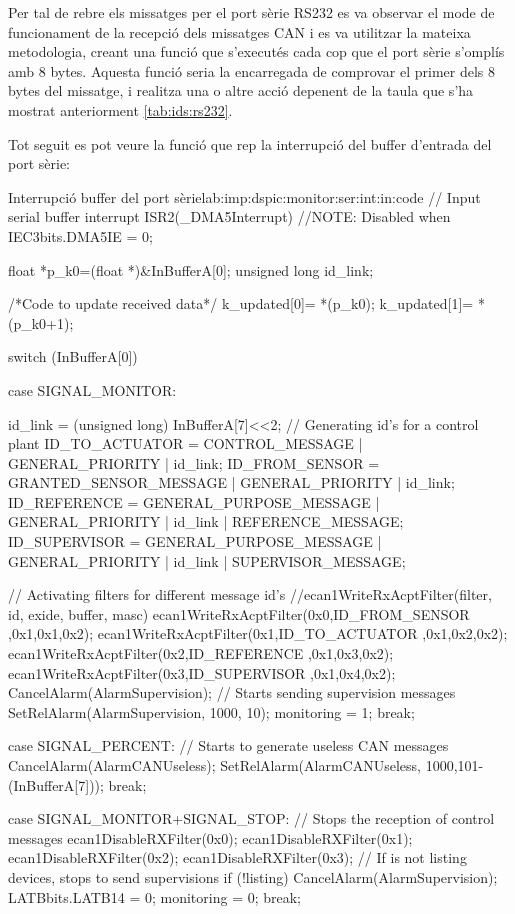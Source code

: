 Per tal de rebre els missatges per el port sèrie RS232 es va observar el mode de funcionament de la recepció dels missatges CAN i es va utilitzar la mateixa metodologia, creant una funció que s'executés cada cop que el port sèrie s'omplís amb 8 bytes. Aquesta funció seria la encarregada de comprovar el primer dels 8 bytes del missatge, i realitza una o altre acció depenent de la taula que s'ha mostrat anteriorment \ref{tab:ids:rs232}.

Tot seguit es pot veure la funció que rep la interrupció del buffer d'entrada del port sèrie:

\begin{code_c}{Interrupció buffer del port sèrie}{lab:imp:dspic:monitor:ser:int:in:code}
// Input serial buffer interrupt
ISR2(_DMA5Interrupt) //NOTE: Disabled when IEC3bits.DMA5IE = 0;
{
	float *p_k0=(float *)&InBufferA[0];
	unsigned long id_link;

	/*Code to update received data*/
	k_updated[0]= *(p_k0);
	k_updated[1]= *(p_k0+1);

	switch (InBufferA[0])
	{
	case SIGNAL_MONITOR:

		id_link = (unsigned long) InBufferA[7]<<2;
		// Generating id's for a control plant
		ID_TO_ACTUATOR 		= CONTROL_MESSAGE 			| GENERAL_PRIORITY | id_link;
		ID_FROM_SENSOR		= GRANTED_SENSOR_MESSAGE 	| GENERAL_PRIORITY | id_link;
		ID_REFERENCE		= GENERAL_PURPOSE_MESSAGE 	| GENERAL_PRIORITY | id_link | REFERENCE_MESSAGE;
		ID_SUPERVISOR		= GENERAL_PURPOSE_MESSAGE 	| GENERAL_PRIORITY | id_link | SUPERVISOR_MESSAGE;

		// Activating filters for different message id's
		//ecan1WriteRxAcptFilter(filter, id, exide, buffer, masc)
		ecan1WriteRxAcptFilter(0x0,ID_FROM_SENSOR	,0x1,0x1,0x2);
		ecan1WriteRxAcptFilter(0x1,ID_TO_ACTUATOR	,0x1,0x2,0x2);
		ecan1WriteRxAcptFilter(0x2,ID_REFERENCE		,0x1,0x3,0x2);
		ecan1WriteRxAcptFilter(0x3,ID_SUPERVISOR	,0x1,0x4,0x2);
		CancelAlarm(AlarmSupervision);
		// Starts sending supervision messages
		SetRelAlarm(AlarmSupervision, 1000, 10);
		monitoring = 1;
		break;

	case SIGNAL_PERCENT:
		// Starts to generate useless CAN messages
		CancelAlarm(AlarmCANUseless);
		SetRelAlarm(AlarmCANUseless, 1000,101-(InBufferA[7]));
		break;

	case SIGNAL_MONITOR+SIGNAL_STOP:
		// Stops the reception of control messages
		ecan1DisableRXFilter(0x0);
		ecan1DisableRXFilter(0x1);
		ecan1DisableRXFilter(0x2);
		ecan1DisableRXFilter(0x3);
		// If is not listing devices, stops to send supervisions
		if (!listing) CancelAlarm(AlarmSupervision);
		LATBbits.LATB14 = 0;
		monitoring = 0;
		break;

}}
\end{code_c}
